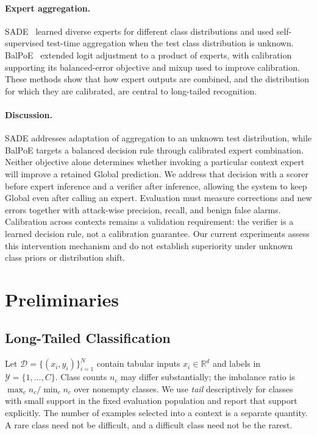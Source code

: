 \documentclass[sigconf,anonymous,pbalance]{acmart}
\begin{document}
\paragraph{Expert aggregation.}
SADE~\cite{Zhang_2022} learned diverse experts for different class distributions and used self-supervised test-time aggregation when the test class distribution is unknown. BalPoE~\cite{Aimar_2023_CVPR} extended logit adjustment to a product of experts, with calibration supporting its balanced-error objective and mixup used to improve calibration. These methods show that how expert outputs are combined, and the distribution for which they are calibrated, are central to long-tailed recognition.

\paragraph{Discussion.}
SADE addresses adaptation of aggregation to an unknown test distribution, while BalPoE targets a balanced decision rule through calibrated expert combination. Neither objective alone determines whether invoking a particular context expert will improve a retained Global prediction. We address that decision with a scorer before expert inference and a verifier after inference, allowing the system to keep Global even after calling an expert. Evaluation must measure corrections and new errors together with attack-wise precision, recall, and benign false alarms. Calibration across contexts remains a validation requirement: the verifier is a learned decision rule, not a calibration guarantee. Our current experiments assess this intervention mechanism and do not establish superiority under unknown class priors or distribution shift.

\section{Preliminaries}
\label{sec:prelim}
\subsection{Long-Tailed Classification}
Let $\mathcal{D}=\{(x_i,y_i)\}_{i=1}^{N}$ contain tabular inputs $x_i\in\mathbb{R}^{d}$ and labels in $\mathcal{Y}=\{1,\ldots,C\}$. Class counts $n_c$ may differ substantially; the imbalance ratio is $\max_c n_c/\min_c n_c$ over nonempty classes. We use \emph{tail} descriptively for classes with small support in the fixed evaluation population and report that support explicitly. The number of examples selected into a context is a separate quantity. A rare class need not be difficult, and a difficult class need not be the rarest.
\end{document}
